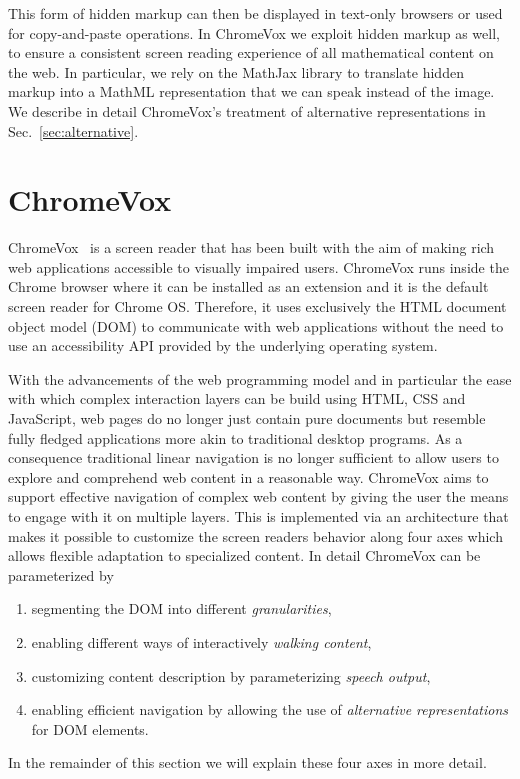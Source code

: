 \documentclass{sig-alternate}
\begin{document}
This form of hidden markup can then be displayed in text-only browsers or used
for copy-and-paste operations.  In ChromeVox we exploit hidden markup as well,
to ensure a consistent screen reading experience of all mathematical content on
the web.  In particular, we rely on the MathJax library to translate hidden
markup into a MathML representation that we can speak instead of the image. We
describe in detail ChromeVox's treatment of alternative representations in
Sec.~\ref{sec:alternative}.




\section{ChromeVox}
\label{sec:chromevox}

ChromeVox~\cite{google:chromevox-tutorial} is a screen reader that has been
built with the aim of making rich web applications accessible to visually impaired
users. ChromeVox runs inside the Chrome browser where it can be installed as an
extension and it is the default screen reader for Chrome OS. Therefore, it uses
exclusively the HTML document object model (DOM) to communicate with web
applications without the need to use an accessibility API provided by the
underlying operating system.

With the advancements of the web programming model and in particular the ease
with which complex interaction layers can be build using HTML, CSS and
JavaScript, web pages do no longer just contain pure documents but resemble
fully fledged applications more akin to traditional desktop programs. As a
consequence traditional linear navigation is no longer sufficient to allow users
to explore and comprehend web content in a reasonable way.  ChromeVox aims to
support effective navigation of complex web content by giving the user the means
to engage with it on multiple layers. This is implemented via an architecture
that makes it possible to customize the screen readers behavior along four axes
which allows flexible adaptation to specialized content. In detail ChromeVox can
be parameterized by
\begin{enumerate}[(1)]
\item segmenting the DOM into different \emph{granularities},
\item enabling different ways of interactively \emph{walking content},
\item customizing content description by parameterizing \emph{speech output},
\item enabling efficient navigation by allowing the use of \emph{alternative
    representations} for DOM elements.
\end{enumerate}
In the remainder of this section we will explain these four axes in more detail.
\end{document}
